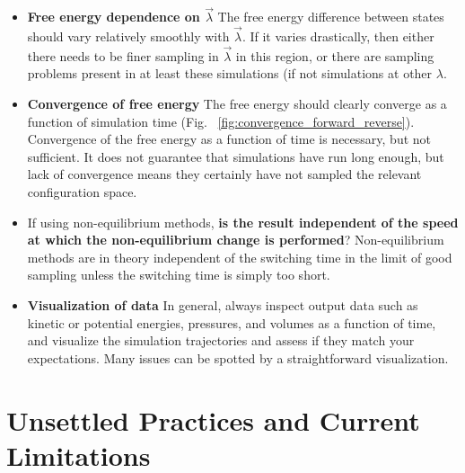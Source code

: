 \documentclass[9pt,bestpractices]{livecoms}
\begin{document}
\begin{itemize}
\item \textbf{Free energy dependence on $\vec{\lambda}$} The free energy difference between states should vary relatively smoothly with $\vec{\lambda}$. If it varies drastically, then either there needs to be finer sampling in $\vec{\lambda}$ in this region, or there are sampling problems present in at least these simulations (if not simulations at other $\lambda$.
\item \textbf{Convergence of free energy} The free energy should clearly converge as a function of simulation time (Fig. ~\ref{fig:convergence_forward_reverse}). Convergence of the free energy as a function of time is necessary, but not sufficient.  It does not guarantee that simulations have run long enough, but lack of convergence means they certainly have not sampled the relevant configuration space.
\item If using non-equilibrium methods, \textbf{is the result independent of the speed at which the non-equilibrium change is performed}? Non-equilibrium methods are in theory independent of the switching time in the limit of good sampling unless the switching time is simply too short. 
\item \textbf{Visualization of data} In general, always inspect output data such as kinetic or potential energies, pressures, and volumes as a function of time, and visualize the simulation trajectories and assess if they match your expectations. Many issues can be spotted by a straightforward visualization. 
\end{itemize}


\section{Unsettled Practices and Current Limitations}
\label{sec:unsettled}
\end{document}
